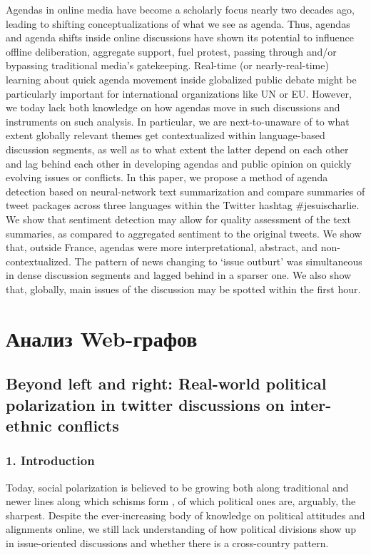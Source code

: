 Agendas in online media have become a scholarly focus nearly two decades ago, leading to shifting conceptualizations of what we see as agenda. Thus, agendas and agenda shifts inside online discussions have shown its potential to influence offline deliberation, aggregate support, fuel protest, passing through and/or bypassing traditional media’s gatekeeping. Real-time (or nearly-real-time) learning about quick agenda movement inside globalized public debate might be particularly important for international organizations like UN or EU. However, we today lack both knowledge on how agendas move in such discussions and instruments on such analysis. In particular, we are next-to-unaware of to what extent globally relevant themes get contextualized within language-based discussion segments, as well as to what extent the latter depend on each other and lag behind each other in developing agendas and public opinion on quickly evolving issues or conflicts. In this paper, we propose a method of agenda detection based on neural-network text summarization and compare summaries of tweet packages across three languages within the Twitter hashtag \#jesuischarlie. We show that sentiment detection may allow for quality assessment of the text summaries, as compared to aggregated sentiment to the original tweets. We show that, outside France, agendas were more interpretational, abstract, and non-contextualized. The pattern of news changing to ‘issue outburt’ was simultaneous in dense discussion segments and lagged behind in a sparser one. We also show that, globally, main issues of the discussion may be spotted within the first hour.

\section{Анализ Web-графов}\label{sec:ch5/sect1}

\subsection{Beyond left and right: Real-world political polarization in twitter discussions on inter-ethnic conflicts}\label{subsec:ch5/sec1/sub1}

\subsubsection{1. Introduction}

Today, social polarization is believed to be growing both along traditional and newer lines along which schisms form \cite{DucaSaving}, of which political ones are, arguably, the sharpest. Despite the ever-increasing body of knowledge on political attitudes and alignments online, we still lack understanding of how political divisions show up in issue-oriented discussions and whether there is a cross-country pattern.

